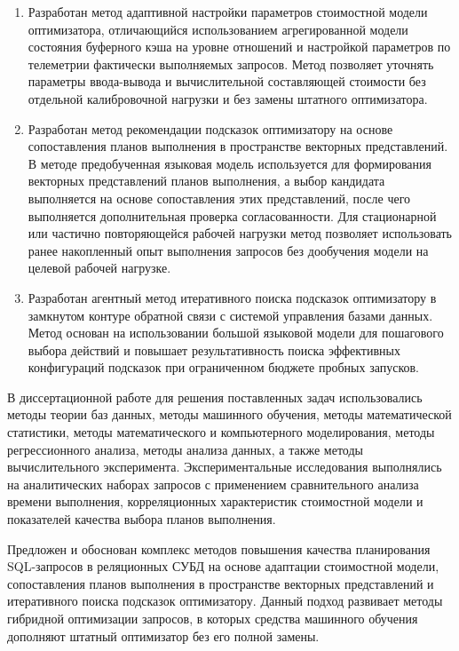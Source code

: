 {\novelty}
\begin{enumerate}[beginpenalty=10000] %
\item Разработан метод адаптивной настройки параметров стоимостной модели оптимизатора, отличающийся использованием агрегированной модели состояния буферного кэша на уровне отношений и настройкой параметров по телеметрии фактически выполняемых запросов. Метод позволяет уточнять параметры ввода-вывода и вычислительной составляющей стоимости без отдельной калибровочной нагрузки и без замены штатного оптимизатора.

\item Разработан метод рекомендации подсказок оптимизатору на основе сопоставления планов выполнения в пространстве векторных представлений. В методе предобученная языковая модель используется для формирования векторных представлений планов выполнения, а выбор кандидата выполняется на основе сопоставления этих представлений, после чего выполняется дополнительная проверка согласованности. Для стационарной или частично повторяющейся рабочей нагрузки метод позволяет использовать ранее накопленный опыт выполнения запросов без дообучения модели на целевой рабочей нагрузке.

\item Разработан агентный метод итеративного поиска подсказок оптимизатору в замкнутом контуре обратной связи с системой управления базами данных. Метод  основан на использовании большой языковой модели для пошагового выбора действий и повышает результативность поиска эффективных конфигураций подсказок при ограниченном бюджете пробных запусков.
\end{enumerate}

{\methods} В диссертационной работе для решения поставленных задач использовались методы теории баз данных, методы машинного обучения, методы математической статистики, методы математического и компьютерного моделирования, методы регрессионного анализа, методы анализа данных, а также методы вычислительного эксперимента. Экспериментальные исследования выполнялись на аналитических наборах запросов с применением сравнительного анализа времени выполнения, корреляционных характеристик стоимостной модели и показателей качества выбора планов выполнения.

{\theoreticalSignificance} Предложен и обоснован комплекс методов повышения качества планирования SQL-запросов в реляционных СУБД на основе адаптации стоимостной модели, сопоставления планов выполнения в пространстве векторных представлений и итеративного поиска подсказок оптимизатору. Данный подход развивает методы гибридной оптимизации запросов, в которых средства машинного обучения дополняют штатный оптимизатор без его полной замены.

